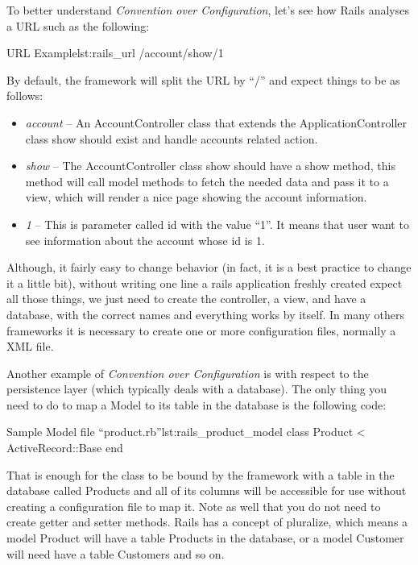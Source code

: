 To better understand \emph{Convention over Configuration}, 
let's see how Rails analyses a URL such as the following:

\begin{rubycode}{URL Example}{lst:rails_url}
  /account/show/1

\end{rubycode}
By default, the framework will split the URL by “/” and expect things to be as follows: 

\begin{itemize}
\item \emph{account} – An AccountController class that extends the ApplicationController class show should exist and
handle accounts related action.
\item \emph{show} – The AccountController class show should have a show method, 
this method will call model methods to fetch the needed data and pass it to a view, 
which will render a nice page showing the account information.
\item \emph{1} – This is parameter called id with the value “1”. 
It means that user want to see information about the account whose id is 1. 
\end{itemize}

Although, it fairly easy to change behavior (in fact, it is a best practice to change it a little bit), 
without writing one line a rails application freshly created expect all those things, 
we just need to create the controller, a view, and have a database, with the correct names and everything works by itself. 
In many others frameworks it is necessary to create one or more configuration files, normally a XML file.

Another example of \emph{Convention over Configuration} is with respect to the persistence layer 
(which typically deals with a database). 
The only thing you need to do to map a Model to its table in the database is the following code:
\begin{rubycode}{Sample Model file “product.rb”}{lst:rails_product_model}
class Product < ActiveRecord::Base 
end
\end{rubycode}

That is enough for the class to be bound by the framework with a table in the database called Products and all of its columns will be accessible for use without creating a configuration file to map it. Note as well that you do not need to create getter and setter methods.
Rails has a concept of pluralize, which means a model Product will have a table Products in the database, or a model Customer will need have a table Customers and so on.



